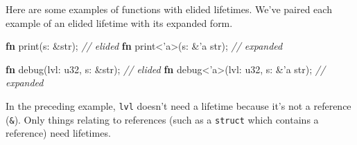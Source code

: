 \documentclass[a4paper,]{book}
\newenvironment{Shaded}{\begin{snugshade}}{\end{snugshade}}
\newcommand{\KeywordTok}[1]{\textcolor[rgb]{0.13,0.29,0.53}{\textbf{{#1}}}}
\newcommand{\DataTypeTok}[1]{\textcolor[rgb]{0.13,0.29,0.53}{{#1}}}
\newcommand{\CommentTok}[1]{\textcolor[rgb]{0.56,0.35,0.01}{\textit{{#1}}}}
\newcommand{\OtherTok}[1]{\textcolor[rgb]{0.56,0.35,0.01}{{#1}}}
\newcommand{\NormalTok}[1]{{#1}}
\begin{document}
Here are some examples of functions with elided lifetimes. We've paired
each example of an elided lifetime with its expanded form.

\begin{Shaded}
\begin{Highlighting}[]
\KeywordTok{fn} \NormalTok{print(s: &}\DataTypeTok{str}\NormalTok{); }\CommentTok{// elided}
\KeywordTok{fn} \NormalTok{print<}\OtherTok{'a}\NormalTok{>(s: &}\OtherTok{'a} \DataTypeTok{str}\NormalTok{); }\CommentTok{// expanded}

\KeywordTok{fn} \NormalTok{debug(lvl: }\DataTypeTok{u32}\NormalTok{, s: &}\DataTypeTok{str}\NormalTok{); }\CommentTok{// elided}
\KeywordTok{fn} \NormalTok{debug<}\OtherTok{'a}\NormalTok{>(lvl: }\DataTypeTok{u32}\NormalTok{, s: &}\OtherTok{'a} \DataTypeTok{str}\NormalTok{); }\CommentTok{// expanded}
\end{Highlighting}
\end{Shaded}

In the preceding example, \texttt{lvl} doesn't need a lifetime because
it's not a reference (\texttt{\&}). Only things relating to references
(such as a \texttt{struct} which contains a reference) need lifetimes.
\end{document}
